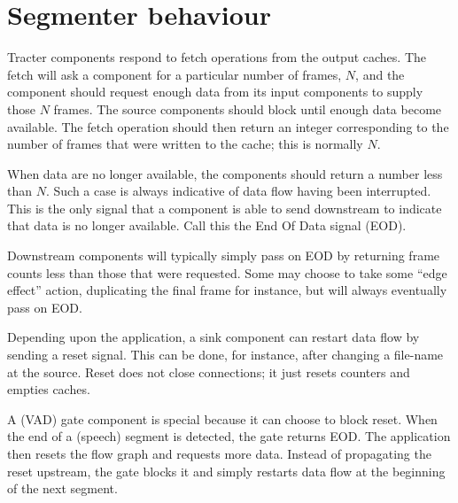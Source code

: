 \section{Segmenter behaviour}

Tracter components respond to fetch operations from the output caches.
The fetch will ask a component for a particular number of frames, $N$,
and the component should request enough data from its input components
to supply those $N$ frames.  The source components should block until
enough data become available.  The fetch operation should then return
an integer corresponding to the number of frames that were written to
the cache; this is normally $N$.

When data are no longer available, the components should return a
number less than $N$.  Such a case is always indicative of data flow
having been interrupted.  This is the only signal that a component is
able to send downstream to indicate that data is no longer available.
Call this the End Of Data signal (EOD).

Downstream components will typically simply pass on EOD by returning
frame counts less than those that were requested.  Some may choose to
take some ``edge effect'' action, duplicating the final frame for
instance, but will always eventually pass on EOD.

Depending upon the application, a sink component can restart data flow
by sending a reset signal.  This can be done, for instance, after
changing a file-name at the source.  Reset does not close connections;
it just resets counters and empties caches.

A (VAD) gate component is special because it can choose to block
reset.  When the end of a (speech) segment is detected, the gate
returns EOD.  The application then resets the flow graph and requests
more data.  Instead of propagating the reset upstream, the gate blocks
it and simply restarts data flow at the beginning of the next segment.


